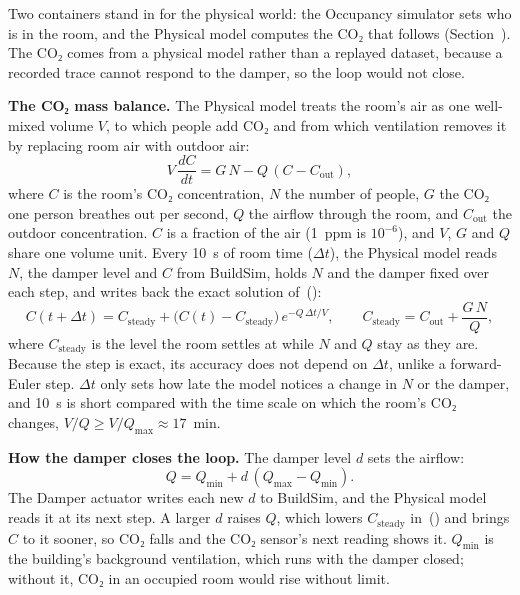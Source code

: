 \documentclass[11pt]{article}
\def\ref#1{\getrefnumber{#1}}%
\begin{document}

Two containers stand in for the physical world: the Occupancy simulator
sets who is in the room, and the Physical model computes the CO₂ that
follows (Section~\ref{sec:usecase}). The CO₂ comes from a physical model
rather than a replayed dataset, because a recorded trace cannot respond
to the damper, so the loop would not close.

\textbf{The CO₂ mass balance.} The Physical model treats the room's air as
one well-mixed volume $V$, to which people add CO₂ and from which
ventilation removes it by replacing room air with outdoor air:
\begin{equation}\label{eq:massbalance}
  V\,\frac{dC}{dt} = G\,N - Q\,(C - C_\text{out}),
\end{equation}
where $C$ is the room's CO₂ concentration, $N$ the number of people, $G$
the CO₂ one person breathes out per second, $Q$ the airflow through the
room, and $C_\text{out}$ the outdoor concentration. $C$ is a fraction of
the air (1~ppm is $10^{-6}$), and $V$, $G$ and $Q$ share one volume unit.
Every 10~s of room time ($\Delta t$), the Physical model reads $N$, the
damper level and $C$ from BuildSim, holds $N$ and the damper fixed over
each step, and writes back the exact solution
of~(\ref{eq:massbalance}):
\begin{equation}\label{eq:step}
  C(t+\Delta t) = C_\text{steady}
  + \big(C(t) - C_\text{steady}\big)\,e^{-Q\,\Delta t/V},
  \qquad
  C_\text{steady} = C_\text{out} + \frac{G\,N}{Q},
\end{equation}
where $C_\text{steady}$ is the level the room settles at while $N$ and $Q$
stay as they are. Because the step is exact, its accuracy does not depend
on $\Delta t$, unlike a forward-Euler step. $\Delta t$ only sets how late the model
notices a change in $N$ or the damper, and 10~s is short compared with
the time scale on which the room's CO₂ changes,
$V/Q \geq V/Q_\text{max} \approx 17$~min.

\textbf{How the damper closes the loop.} The damper level $d$ sets the
airflow:
\begin{equation}\label{eq:airflow}
  Q = Q_\text{min} + d\,(Q_\text{max} - Q_\text{min}).
\end{equation}
The Damper actuator writes each new $d$ to BuildSim, and the Physical
model reads it at its next step. A larger $d$ raises $Q$, which lowers
$C_\text{steady}$ in~(\ref{eq:step}) and brings $C$ to it sooner, so CO₂
falls and the CO₂ sensor's next reading shows it. $Q_\text{min}$ is the
building's background ventilation, which runs with the damper closed;
without it, CO₂ in an occupied room would rise without limit.
\end{document}
